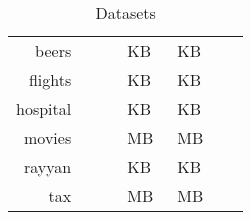 \begin{table}[!t]
\caption{\label{tab:datasets_table}Datasets}
\centering
\begin{tabular}{r|K|K|K|K|H|K}
\toprule
 &  &  &   &   &  & \\
\midrule
beers    &    &  &  \ \textsc{KB} &  \ \textsc{KB} &   &  \\
flights  &    &   &  \ \textsc{KB} &   \ \textsc{KB} &   &  \\
hospital &    &  &  \ \textsc{KB} &  \ \textsc{KB} &  &  \\
movies   &    &  & \ \textsc{MB} & \ \textsc{MB} &  &  \\
rayyan   &    &  &  \ \textsc{KB} &   \ \textsc{KB} &   &  \\
tax      &  &  & \ \textsc{MB} & \ \textsc{MB} &  &  \\
\bottomrule    
\end{tabular}
\end{table}
